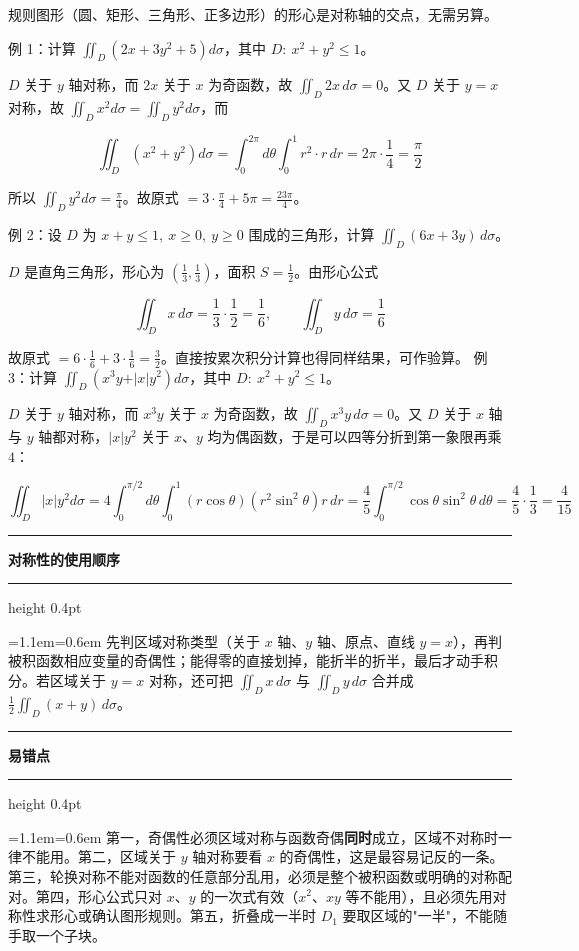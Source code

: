 \documentclass[11pt,openany,UTF8]{ctexbook}
\newcommand{\callouthead}[2]{%
  \par\addvspace{7pt}\noindent
  {\color{#1}\rule[-0.15em]{3pt}{1.05em}}\hspace{0.5em}%
  {\bfseries\color{#1}#2}\par\nobreak\vspace{-0.35em}%
  {\color{rulesep}\hrule height 0.4pt}\nobreak\vspace{0.45em}%
  \begingroup\small\setlength{\parindent}{0pt}%
  \leftskip=1.1em\rightskip=0.6em\noindent\ignorespaces}
\newcommand{\calloutend}{\par\endgroup\addvspace{7pt}}
\newenvironment{callkey}[1]{\callouthead{keybar}{#1}}{\calloutend}
\newenvironment{callwarn}[1]{\callouthead{warnbar}{#1}}{\calloutend}
\begin{document}
规则图形（圆、矩形、三角形、正多边形）的形心是对称轴的交点，无需另算。

例 1：计算 $\displaystyle\iint_{D}\left(2x+3y^{2}+5\right)d\sigma$，其中 $D:\ x^{2}+y^{2}\le 1$。

$D$ 关于 $y$ 轴对称，而 $2x$ 关于 $x$ 为奇函数，故 $\iint_{D}2x\,d\sigma=0$。又 $D$ 关于 $y=x$ 对称，故 $\iint_{D}x^{2}d\sigma=\iint_{D}y^{2}d\sigma$，而

\[\iint_{D}\left(x^{2}+y^{2}\right)d\sigma=\int_{0}^{2\pi}d\theta\int_{0}^{1}r^{2}\cdot r\,dr=2\pi\cdot\frac14=\frac{\pi}{2}\]

所以 $\iint_{D}y^{2}d\sigma=\frac{\pi}{4}$。故原式 $=3\cdot\frac{\pi}{4}+5\pi=\frac{23\pi}{4}$。

例 2：设 $D$ 为 $x+y\le 1,\ x\ge 0,\ y\ge 0$ 围成的三角形，计算 $\displaystyle\iint_{D}(6x+3y)\,d\sigma$。

$D$ 是直角三角形，形心为 $\left(\frac13,\frac13\right)$，面积 $S=\frac12$。由形心公式

\[\iint_{D}x\,d\sigma=\frac13\cdot\frac12=\frac16,\qquad \iint_{D}y\,d\sigma=\frac16\]

故原式 $=6\cdot\frac16+3\cdot\frac16=\frac32$。直接按累次积分计算也得同样结果，可作验算。 例 3：计算 $\displaystyle\iint_{D}\left(x^{3}y+\vert x\vert y^{2}\right)d\sigma$，其中 $D:\ x^{2}+y^{2}\le 1$。

$D$ 关于 $y$ 轴对称，而 $x^{3}y$ 关于 $x$ 为奇函数，故 $\iint_{D}x^{3}y\,d\sigma=0$。又 $D$ 关于 $x$ 轴与 $y$ 轴都对称，$\vert x\vert y^{2}$ 关于 $x$、$y$ 均为偶函数，于是可以四等分折到第一象限再乘 $4$：

\[\iint_{D}\vert x\vert y^{2}d\sigma=4\int_{0}^{\pi/2}d\theta\int_{0}^{1}\left(r\cos\theta\right)\left(r^{2}\sin^{2}\theta\right)r\,dr=\frac45\int_{0}^{\pi/2}\cos\theta\sin^{2}\theta\,d\theta=\frac45\cdot\frac13=\frac{4}{15}\]

\begin{callkey}{对称性的使用顺序}
先判区域对称类型（关于 $x$ 轴、$y$ 轴、原点、直线 $y=x$），再判被积函数相应变量的奇偶性；能得零的直接划掉，能折半的折半，最后才动手积分。若区域关于 $y=x$ 对称，还可把 $\iint_{D}x\,d\sigma$ 与 $\iint_{D}y\,d\sigma$ 合并成 $\frac12\iint_{D}(x+y)\,d\sigma$。

\end{callkey}

\begin{callwarn}{易错点}
第一，奇偶性必须区域对称与函数奇偶\textbf{同时}成立，区域不对称时一律不能用。第二，区域关于 $y$ 轴对称要看 $x$ 的奇偶性，这是最容易记反的一条。第三，轮换对称不能对函数的任意部分乱用，必须是整个被积函数或明确的对称配对。第四，形心公式只对 $x$、$y$ 的一次式有效（$x^{2}$、$xy$ 等不能用），且必须先用对称性求形心或确认图形规则。第五，折叠成一半时 $D_1$ 要取区域的"一半"，不能随手取一个子块。

\end{callwarn}
\end{document}
